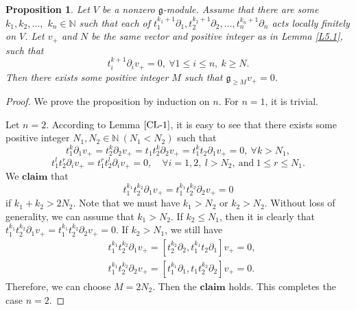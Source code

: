 \documentclass[12pt, a4paper]{amsart}
\newcommand{\fg}{\mathfrak g}
\newcommand{\N}{\mathbb N}
\theoremstyle{Theorem}
\theoremstyle{Theorem}
\newtheorem{proposition}[thm]{Proposition}
\numberwithin{equation}{section}
\begin{document}
\begin{proposition}\label{key11}
	Let $V$ be a nonzero $\fg$-module. Assume that there are  some $k_{1},k_{2},\dots,$ $k_{n}\in\N$ such that each of $t_{1}^{k_{1}+1}\partial_{1},t_{2}^{k_{2}+1}\partial_{2},\dots, t_{n}^{k_{n}+1}\partial_{n}$
	acts locally finitely on $V$. Let $v_+$ and $N$ be the same vector and positive integer as in Lemma \ref{L5.1}, such that  
	\begin{equation*}
		t_i^{k+1}\partial_iv_+=0,~\forall 1\le i\le n,~k\geq N.
	\end{equation*}
	Then there exists some positive integer $M$ such that $\mathfrak{g}_{\ge M}v_+=0$.
\end{proposition}

\begin{proof}
	We prove the proposition by induction on $n$. For $n=1$, it is trivial.	
	\bigskip
	
	Let $n=2$. According to Lemma $\ref{CL-1}$, it is easy to see that there exists some positive integer $N_1, N_2 \in \mathbb{N} \ (N_1<N_2)$ such that
	\begin{equation*}
		t_1^k\partial_1v_+=	t_2^k\partial_2v_+=t_1t_2^k\partial_2v_+=t_1^kt_2\partial_1v_+=0,~\forall k>N_1,
	\end{equation*}
	\begin{equation*}
		t_1^lt_2^r\partial_iv_+=t_1^rt_2^l\partial_iv_+=0, \quad \forall  i=1,2,~l>N_2, \ \text{and} \ 1\le r\le N_1.
	\end{equation*}
	We $\mathbf{claim}$ that
	\begin{equation*}
		t_1^{k_1}t_2^{k_2}\partial_1v_+=t_1^{k_1}t_2^{k_2}\partial_2v_+=0
	\end{equation*}
	if $k_1+k_2>2N_2$.  Note that we must have $k_1>N_2$ or $k_2>N_2$. Without loss of  generality, we can assume that $k_1>N_2$.  If $k_2\le N_1$, then it is clearly that  $	t_1^{k_1}t_2^{k_2}\partial_1v_+=t_1^{k_1}t_2^{k_2}\partial_2v_+=0$. If $k_2> N_1$, we still have
	\begin{align*}
		&t_1^{k_1}t_2^{k_2}\partial_1v_+=[t_2^{k_2}\partial_2,t_1^{k_1}t_2\partial_1]v_+=0,\\
		&t_1^{k_1}t_2^{k_2}\partial_2v_+=[t_1^{k_1}\partial_1,t_1t_2^{k_2}\partial_2]v_+=0.
	\end{align*}
Therefore, we can choose $M = 2N_2$.  Then the $\mathbf{claim}$ holds. This completes the case $n=2$.
	\bigskip
	

\end{proof}
\end{document}
